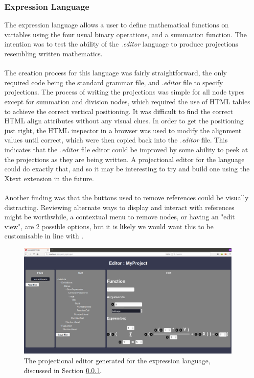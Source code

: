 \documentclass{article}
\begin{document}
{\subsubsection{Expression Language}\label{expressionLang}
The expression language allows a user to define mathematical functions on variables using the four usual binary operations, and a summation function. The intention was to test the ability of the \emph{.editor} language to produce projections resembling written mathematics.
\\
\\
The creation process for this language was fairly straightforward, the only required code being the standard grammar file, and \emph{.editor} file to specify projections. The process of writing the projections was simple for all node types except for summation and division nodes, which required the use of HTML tables to achieve the correct vertical positioning. It was difficult to find the correct HTML align attributes without any visual clues. In order to get the positioning just right, the HTML inspector in a browser was used to modify the alignment values until correct, which were then copied back into the \emph{.editor} file. This indicates that the \emph{.editor} file editor could be improved by some ability to peek at the projections as they are being written. A projectional editor for the language could do exactly that, and so it may be interesting to try and build one using the Xtext extension in the future.   
\\
\\
Another finding was that the buttons used to remove references could be visually distracting. Reviewing alternate ways to display and interact with references might be worthwhile, a contextual menu to remove nodes, or having an "edit view", are 2 possible options, but it is likely we would want this to be customisable in line with \RCustom.
\begin{figure}[h!]
  \centering
  \includegraphics[width=\linewidth]{./Screenshots/arithmeticUI3.png}
  \caption{The projectional editor generated for the expression language, discussed in Section \ref{expressionLang}.}
  \label{fig:arithmeticUI}
\end{figure}


}
\end{document}
